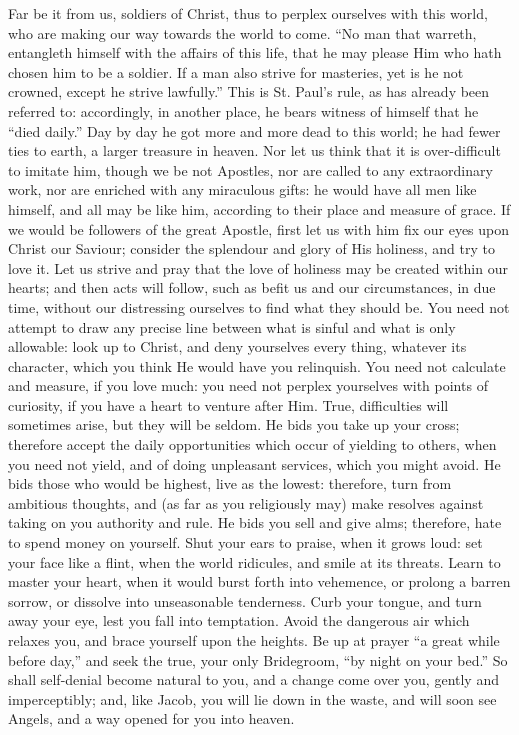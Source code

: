 Far be it from us, soldiers of Christ, thus to perplex ourselves
with this world, who are making our way towards the world to come.
``No man that warreth, entangleth himself with the affairs of this
life, that he may please Him who hath chosen him to be a soldier. If a
man also strive for masteries, yet is he not crowned, except he strive
lawfully.'' This is St. Paul's rule, as has already been referred
to: accordingly, in another place, he bears witness of himself that he
``died daily.'' Day by day he got more and more dead to this
world; he had fewer ties to earth, a larger treasure in heaven. Nor
let us think that it is over-difficult to imitate him, though we be
not Apostles, nor are called to any extraordinary work, nor are
enriched with any miraculous gifts: he would have all men like
himself, and all may be like him, according to their place and measure
of grace. If we would be followers of the great Apostle, first let us
with him fix our eyes upon Christ our Saviour; consider the splendour
and glory of His holiness, and try to love it. Let us strive and pray
that the love of holiness may be created within our hearts; and then
acts will follow, such as befit us and our circumstances, in due time,
without our distressing ourselves to find what they should be. You
need not attempt to draw any precise line between what is sinful and
what is only allowable: look up to Christ, and deny yourselves every
thing, whatever its character, which you think He would have you
relinquish. You need not calculate and measure, if you love much: you
need not perplex yourselves with points of curiosity, if you have a
heart to venture after Him. True, difficulties will sometimes arise,
but they will be seldom. He bids you take up your cross; therefore
accept the daily opportunities which occur of yielding to others, when
you need not yield, and of doing unpleasant services, which you might
avoid. He bids those who would be highest, live as the lowest:
therefore, turn from ambitious thoughts, and (as far as you
religiously may) make resolves against taking on you authority and
rule. He bids you sell and give alms; therefore, hate to spend money
on yourself. Shut your ears to praise, when it grows loud: set your
face like a flint, when the world ridicules, and smile at its threats.
Learn to master your heart, when it would burst forth into vehemence,
or prolong a barren sorrow, or dissolve into unseasonable tenderness.
Curb your tongue, and turn away your eye, lest you fall into
temptation. Avoid the dangerous air which relaxes you, and brace
yourself upon the heights. Be up at prayer ``a great while before
day,'' and seek the true, your only Bridegroom, ``by night on
your bed.'' So shall self-denial become natural to you, and a
change come over you, gently and imperceptibly; and, like Jacob, you
will lie down in the waste, and will soon see Angels, and a way opened
for you into heaven.

